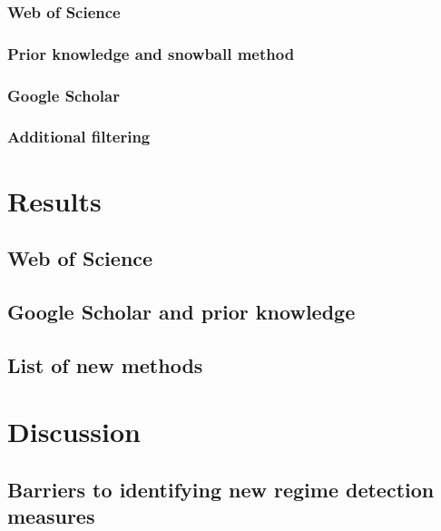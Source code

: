 \documentclass[12pt,twoside,openany]{reedthesis}
\begin{document}
\subsubsection{Web of Science}\label{web-of-science}

\subsubsection{Prior knowledge and snowball
method}\label{prior-knowledge-and-snowball-method}

\subsubsection{Google Scholar}\label{google-scholar}

\subsubsection{Additional filtering}\label{additional-filtering}

\section{Results}\label{results}

\subsection{Web of Science}\label{web-of-science-1}

\subsection{Google Scholar and prior
knowledge}\label{google-scholar-and-prior-knowledge}

\subsection{List of new methods}\label{list-of-new-methods}

\section{Discussion}\label{discussion}

\subsection{Barriers to identifying new regime detection
measures}\label{barriers-to-identifying-new-regime-detection-measures}
\end{document}
